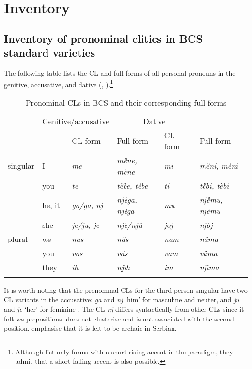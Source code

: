 \section{Inventory}
\label{Inventory:7}
\subsection{Inventory of pronominal clitics in BCS standard varieties}
\label{Inventory of pronominal clitics in BCS standard varieties}
The following table lists the CL and full forms of all personal pronouns in the genitive, accusative, and dative (\citealt[cf.][208f]{Baric97}, \citealt[363f]{MrazovicVukadinovic09}).\footnote{Although \citet[363f]{MrazovicVukadinovic09} list only forms with a short rising accent in the paradigm, they admit that a short falling accent is also possible.}

\begin{table}
\caption{Pronominal CLs in BCS and their corresponding full forms\label{table:clcorr}}
\begin{tabular}{llllll}
\lsptoprule
\multicolumn{2}{c}{ } & \multicolumn{2}{c}{Genitive/accusative} & \multicolumn{2}{c}{Dative} \\
\cmidrule(lr){3-4}\cmidrule(lr){5-6}
\multicolumn{2}{c}{} & CL form & Full form & CL form& Full form\\
\midrule
 singular& I & \textit{me} 	& \textit{mȅne, mène} & \textit{mi} & \textit{mȅni, mèni} \\
 & you & \textit{te} & \textit{tȅbe, tèbe} & \textit{ti}	& \textit{tȅbi, tèbi} \\
 & he, it & \textit{ga/ga, nj} & \textit{njȅga, njèga} & \textit{mu} & \textit{njȅmu, njèmu} \\
 & she & \textit{je/ju, je} & \textit{njȇ/njû} & \textit{joj} & \textit{njȏj} \\
 \tablevspace
plural & we	& \textit{nas} & \textit{nȃs} & \textit{nam} & \textit{nȁma}\\
 & you & \textit{vas} & \textit{vȃs} & \textit{vam} & \textit{vȁma}\\
 & they& \textit{ih} & \textit{njȋh} & \textit{im} & \textit{njȉma}\\
\lspbottomrule
\end{tabular}
\end{table}



It is worth noting that the pronominal CLs for the third person singular have two CL variants in the accusative: \textit{ga} and \textit{nj} `him' for masculine and neuter, and \textit{ju} and \textit{je} `her' for feminine \citep[cf.][366]{MrazovicVukadinovic09}. The CL \textit{nj} differs syntactically from other CLs since it follows prepositions, does not clusterise and is not associated with the second position. \citet[128]{MrazovicVukadinovic09} emphasise that it is felt to be archaic in Serbian.

